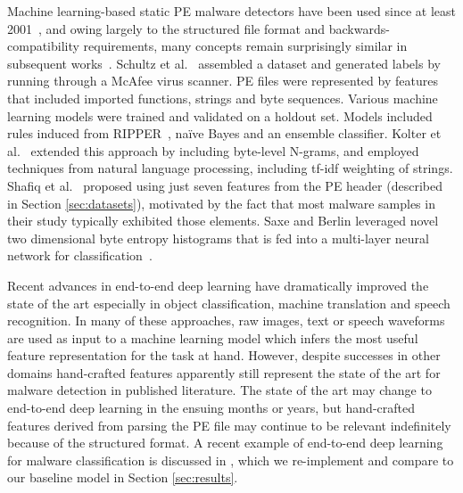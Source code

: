 Machine learning-based static PE malware detectors have been used since at least 2001~\cite{schultz2001data}, and owing largely to the structured file format and backwards-compatibility requirements, many concepts remain surprisingly similar in subsequent works~\cite{kolter2004learning, shafiq2009framework, raman2012selecting, dahl2013large, saxe2015deep}.  Schultz et al.~\cite{schultz2001data} assembled a dataset and generated labels by running through a McAfee virus scanner.  PE files were represented by features that included imported functions, strings and byte sequences.  Various machine learning models were trained and validated on a holdout set. Models included rules induced from RIPPER~\cite{cohen1995fast}, na\"{i}ve Bayes and an ensemble classifier. Kolter et al.~\cite{kolter2004learning} extended this approach by including byte-level N-grams, and employed techniques from natural language processing, including tf-idf weighting of strings.  Shafiq et al.~\cite{shafiq2009framework} proposed using just seven features from the PE header (described in Section \ref{sec:datasets}), motivated by the fact that most malware samples in their study typically exhibited those elements.  Saxe and Berlin leveraged novel two dimensional byte entropy histograms that is fed into a multi-layer neural network for classification~\cite{saxe2015deep}.  

Recent advances in end-to-end deep learning have dramatically improved the state of the art especially in object classification, machine translation and speech recognition.  In many of these approaches, raw images, text or speech waveforms are used as input to a machine learning model which infers the most useful feature representation for the task at hand.  However, despite successes in other domains hand-crafted features apparently still represent the state of the art for malware detection in published literature.  The state of the art may change to end-to-end deep learning in the ensuing months or years, but hand-crafted features derived from parsing the PE file may continue to be relevant indefinitely because of the structured format.  A recent example of end-to-end deep learning for malware classification is discussed in \cite{raff2017malware}, which we re-implement and compare to our baseline model in Section \ref{sec:results}.


